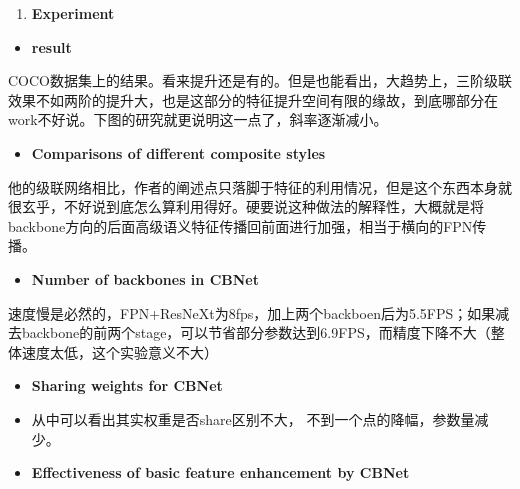 \begin{enumerate}
\def\labelenumi{\arabic{enumi}.}
\setcounter{enumi}{2}
\item
  \textbf{Experiment}
\end{enumerate}

\begin{itemize}
\item
  \textbf{result}\\
\end{itemize}

COCO数据集上的结果。看来提升还是有的。但是也能看出，大趋势上，三阶级联效果不如两阶的提升大，也是这部分的特征提升空间有限的缘故，到底哪部分在work不好说。下图的研究就更说明这一点了，斜率逐渐减小。

\begin{itemize}
\item
  \textbf{Comparisons of different composite styles}\\
\end{itemize}

他的级联网络相比，作者的阐述点只落脚于特征的利用情况，但是这个东西本身就很玄乎，不好说到底怎么算利用得好。硬要说这种做法的解释性，大概就是将backbone方向的后面高级语义特征传播回前面进行加强，相当于横向的FPN传播。

\begin{itemize}
\item
  \textbf{Number of backbones in CBNet}\\
\end{itemize}

速度慢是必然的，FPN+ResNeXt为8fps，加上两个backboen后为5.5FPS；如果减去backbone的前两个stage，可以节省部分参数达到6.9FPS，而精度下降不大（整体速度太低，这个实验意义不大）

\begin{itemize}
\item
  \textbf{Sharing weights for CBNet}\\
\item
  从中可以看出其实权重是否share区别不大， 不到一个点的降幅，参数量减少。
\item
  \textbf{Effectiveness of basic feature enhancement by CBNet}\\
\end{itemize}

